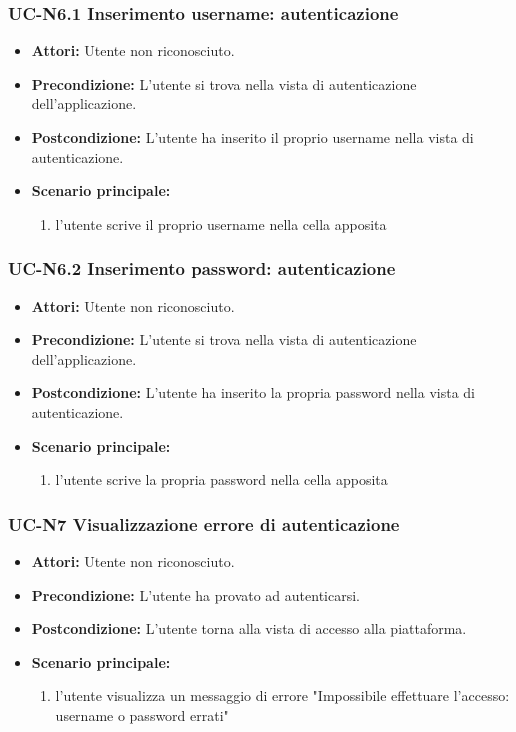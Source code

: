 		

\subsubsection{UC-N6.1 Inserimento username: autenticazione}
\begin{itemize}
	\item \textbf{Attori:} Utente non riconosciuto.
			\item \textbf{Precondizione:} L'utente si trova nella vista di autenticazione dell'applicazione.
			\item \textbf{Postcondizione:} L'utente ha inserito il proprio username nella vista di autenticazione.
			\item \textbf{Scenario principale:}
				\begin{enumerate}
					\item l'utente scrive il proprio username nella cella apposita
				\end{enumerate}
\end{itemize}

\subsubsection{UC-N6.2 Inserimento password: autenticazione}
\begin{itemize}
	\item \textbf{Attori:} Utente non riconosciuto.
			\item \textbf{Precondizione:} L'utente si trova nella vista di autenticazione dell'applicazione.
			\item \textbf{Postcondizione:} L'utente ha inserito la propria password nella vista di autenticazione.
			\item \textbf{Scenario principale:}
				\begin{enumerate}
					\item l'utente scrive la propria password nella cella apposita
				\end{enumerate}
\end{itemize}
		
\subsubsection{UC-N7 Visualizzazione errore di autenticazione}
		\begin{itemize}
			\item \textbf{Attori:} Utente non riconosciuto.
			\item \textbf{Precondizione:} L'utente ha provato ad autenticarsi.
			\item \textbf{Postcondizione:} L'utente torna alla vista di accesso alla piattaforma.
			\item \textbf{Scenario principale:}
			\begin{enumerate}
				\item l'utente visualizza un messaggio di errore "Impossibile effettuare l'accesso: username o password errati"
			\end{enumerate}
		\end{itemize}
		

